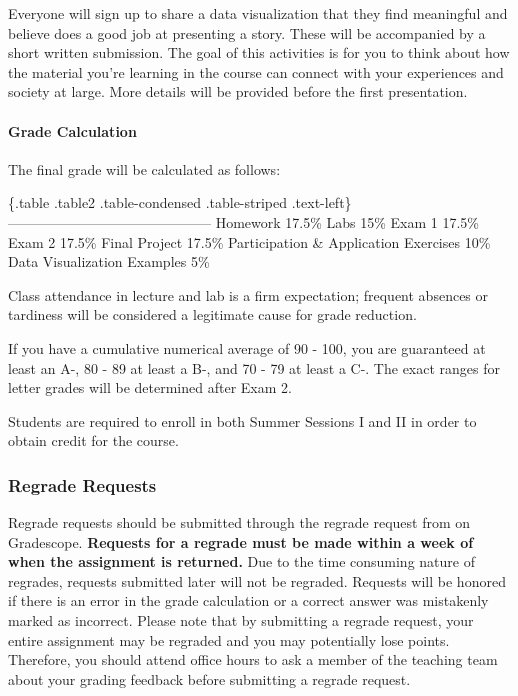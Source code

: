 \documentclass[]{article}
\let\oldparagraph\paragraph
\renewcommand{\paragraph}[1]{\oldparagraph{#1}\mbox{}}
\begin{document}
Everyone will sign up to share a data visualization that they find
meaningful and believe does a good job at presenting a story. These will
be accompanied by a short written submission. The goal of this
activities is for you to think about how the material you're learning in
the course can connect with your experiences and society at large. More
details will be provided before the first presentation.

\hypertarget{grade-calculation}{%
\paragraph{Grade Calculation}\label{grade-calculation}}

The final grade will be calculated as follows:

\{.table .table2 .table-condensed .table-striped .text-left\} {}
\textbar{} {}\\
-----------\textbar{}--------------------------------- Homework
\textbar{} 17.5\% Labs \textbar{} 15\% Exam 1 \textbar{} 17.5\% Exam 2
\textbar{} 17.5\% Final Project \textbar{} 17.5\% Participation \&
Application Exercises \textbar{} 10\% Data Visualization Examples
\textbar{} 5\%

Class attendance in lecture and lab is a firm expectation; frequent
absences or tardiness will be considered a legitimate cause for grade
reduction.

If you have a cumulative numerical average of 90 - 100, you are
guaranteed at least an A-, 80 - 89 at least a B-, and 70 - 79 at least a
C-. The exact ranges for letter grades will be determined after Exam 2.

Students are required to enroll in both Summer Sessions I and II in
order to obtain credit for the course.

\hypertarget{regrade-requests}{%
\subsubsection{Regrade Requests}\label{regrade-requests}}

Regrade requests should be submitted through the regrade request from on
Gradescope. \textbf{Requests for a regrade must be made within a week of
when the assignment is returned.} Due to the time consuming nature of
regrades, requests submitted later will not be regraded. Requests will
be honored if there is an error in the grade calculation or a correct
answer was mistakenly marked as incorrect. Please note that by
submitting a regrade request, your entire assignment may be regraded and
you may potentially lose points. Therefore, you should attend office
hours to ask a member of the teaching team about your grading feedback
before submitting a regrade request.
\end{document}
